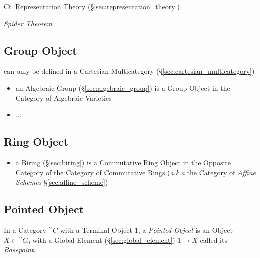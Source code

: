 \fist Cf. Representation Theory (\S\ref{sec:representation_theory})

\emph{Spider Theorem}



\subsection{Group Object}\label{sec:group_object}

can only be defined in a Cartesian Multicategory
(\S\ref{sec:cartesian_multicategory})

\begin{itemize}
  \item an Algebraic Group (\S\ref{sec:algebraic_group}) is a Group Object in
    the Category of Algebraic Varieties
  \item ...
\end{itemize}



\subsection{Ring Object}\label{sec:ring_object}

\begin{itemize}
  \item a Biring (\S\ref{sec:biring}) is a Commutative Ring Object in the
    Opposite Category of the Category of Commutative Rings
    (\emph{a.k.a} the Category of \emph{Affine Schemes}
    \S\ref{sec:affine_scheme})
\end{itemize}



\subsection{Pointed Object}\label{sec:pointed_object}

In a Category $\cat{C}$ with a Terminal Object $1$, a \emph{Pointed Object} is
an Object $X \in \cat{C}_0$ with a Global Element (\S\ref{sec:global_element})
$1 \rightarrow X$ called its \emph{Basepoint}.


